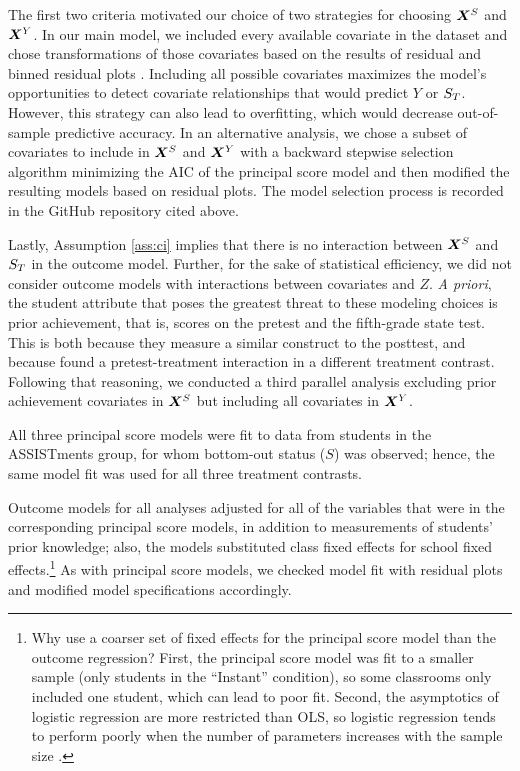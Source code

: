 \documentclass[]{article}
\begin{document}
The first two criteria motivated our choice of two strategies for choosing $\bm{X}^S$ and $\bm{X}^Y$.
In our main model, we included every available covariate in the dataset and chose transformations of those covariates based on the results of residual and binned residual plots \citep{arm}.
Including all possible covariates maximizes the model's opportunities to detect covariate relationships that would predict $Y$ or $S_T$.
However, this strategy can also lead to overfitting, which would decrease out-of-sample predictive accuracy.
In an alternative analysis, we chose a subset of covariates to include in $\bm{X}^S$ and $\bm{X}^Y$ with a backward stepwise selection algorithm minimizing the AIC \citep{aic} of the principal score model and then modified the resulting models based on residual plots.
The model selection process is recorded in the GitHub repository cited above.

Lastly, Assumption \ref{ass:ci} implies that there is no interaction between $\bm{X}^S$ and $S_T$ in the outcome model. Further, for the sake of statistical efficiency, we did not consider outcome models with interactions between covariates and $Z$.
\emph{A priori}, the student attribute that poses the greatest threat to these modeling choices is prior achievement, that is, scores on the pretest and the fifth-grade state test.
This is both because they measure a similar construct to the posttest, and because \cite{impactPaper} found a pretest-treatment interaction in a different treatment contrast.
Following that reasoning, we conducted a third parallel analysis excluding prior achievement covariates in $\bm{X}^S$ but including all covariates in $\bm{X}^Y$.

All three principal score models were fit to data from students in the ASSISTments group, for whom bottom-out status ($S$) was observed; hence, the same model fit was used for all three treatment contrasts.

Outcome models for all analyses adjusted for all of the variables that were in the corresponding principal score models, in addition to measurements of students' prior knowledge; also, the models substituted class fixed effects for school fixed effects.\footnote{Why use a coarser set of fixed effects for the principal score model than the outcome regression? First, the principal score model was fit to a smaller sample (only students in the ``Instant'' condition), so some classrooms only included one student, which can lead to poor fit. Second, the asymptotics of logistic regression are more restricted than OLS, so logistic regression tends to perform poorly when the number of parameters increases with the sample size \citep{agresti}.}
As with principal score models, we checked model fit with residual plots and modified model specifications accordingly.
\end{document}
